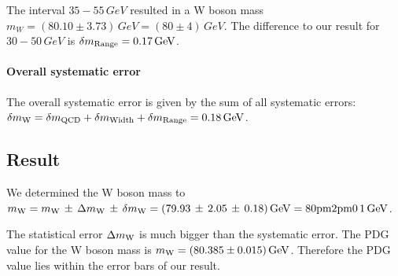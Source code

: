 The interval $35 - 55\,\si{GeV}$ resulted in a W boson mass $m_W = (80.10
\pm 3.73)\,\si{GeV} = (80 \pm 4)\,\si{GeV}$. The difference to our result for $30 - 50\,\si{GeV}$ is $\delta m\ind{Range} = 0.17\,\si{GeV}$.

\paragraph{Overall systematic error}
The overall systematic error is given by the sum of all systematic errors: $\delta m\ind{W} = \delta m\ind{QCD} + \delta m\ind{Width} + \delta m\ind{Range} = 0.18\, \si{GeV}$. 
 
\subsection{Result}

We determined the W boson mass to $m\ind{W} = m\ind{W}\,\pm\,\Delta m\ind{W}\,\pm\,\delta m\ind{W} = (79.93\,\pm\,2.05\,\pm\,0.18)\, \si{GeV} = \si{80 \pm 2 \pm 0.1}\, \si{GeV}$.

The statistical error $\Delta m\ind{W}$ is much bigger than the systematic error. The PDG value for the W boson mass is $m\ind{W} = (80.385 \pm 0.015)\,\si{GeV}$\cite{pdg}. Therefore the PDG value lies within the error bars of our result.
 
 